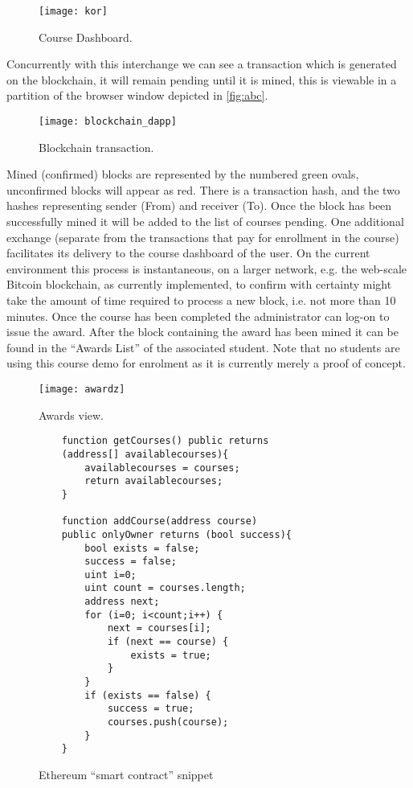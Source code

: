\begin{figure}[!ht]
  \centering
      \texttt{[image: kor]}
  \caption{Course Dashboard.}
\end{figure}

Concurrently with this interchange we can see a transaction which is generated on the blockchain, it will remain pending until it is mined, this is viewable in a partition of the browser window depicted in \autoref{fig:abc}. 

\begin{figure}[!ht]
  \centering
      \texttt{[image: blockchain\_dapp]}
  \caption{Blockchain transaction.}
        \label{fig:abc}
\end{figure}

Mined (confirmed) blocks are represented by the numbered green ovals, unconfirmed blocks will appear as red. 
There is a transaction hash, and the two hashes representing sender (From) and receiver (To). 
Once the block has been successfully mined it will be added to the list of courses pending. One additional exchange (separate from the transactions that pay for enrollment in the course) facilitates its delivery to the course dashboard of the user.
On the current environment this process is instantaneous, on a larger network, e.g. the web-scale Bitcoin blockchain, as currently implemented, to confirm with certainty might take the amount of time required to process a new block, i.e. not more than 10 minutes. Once the course has been completed the administrator can log-on to issue the award. 
After the block containing the award has been mined it can be found in the ``Awards List'' of the associated student. 
Note that no students are using this course demo for enrolment as it is currently merely a proof of concept.

\begin{figure}[!ht]
  \centering
      \texttt{[image: awardz]}
  \caption{Awards view.}
\end{figure}
\begin{figure}[!ht]
  \centering
\begin{lstlisting}
	function getCourses() public returns
	(address[] availablecourses){
		availablecourses = courses;
		return availablecourses;
	}
	
	function addCourse(address course) 
	public onlyOwner returns (bool success){
		bool exists = false;
		success = false;
		uint i=0;
		uint count = courses.length;
		address next;
		for (i=0; i<count;i++) {
			next = courses[i];
			if (next == course) {
				exists = true;
			}
		}
		if (exists == false) {
			success = true;
			courses.push(course);
		}
	}
\end{lstlisting}
  \caption{Ethereum ``smart contract'' snippet}
\end{figure}

